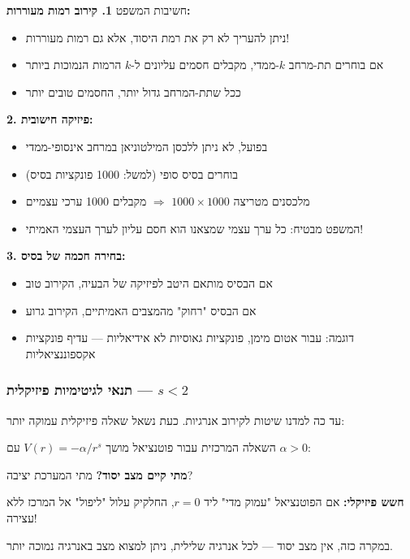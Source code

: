 \begin{importantbox}{חשיבות המשפט}
\textbf{1. קירוב רמות מעוררות:}
\begin{itemize}
    \item ניתן להעריך לא רק את רמת היסוד, אלא גם רמות מעוררות!
    \item אם בוחרים תת-מרחב $k$-ממדי, מקבלים חסמים עליונים ל-$k$ הרמות הנמוכות ביותר
    \item ככל שתת-המרחב גדול יותר, החסמים טובים יותר
\end{itemize}

\textbf{2. פיזיקה חישובית:}
\begin{itemize}
    \item בפועל, לא ניתן ללכסן המילטוניאן במרחב אינסופי-ממדי
    \item בוחרים בסיס סופי (למשל: 1000 פונקציות בסיס)
    \item מלכסנים מטריצה $1000 \times 1000$ $\Rightarrow$ מקבלים 1000 ערכי עצמיים
    \item המשפט מבטיח: כל ערך עצמי שמצאנו הוא חסם עליון לערך העצמי האמיתי!
\end{itemize}

\textbf{3. בחירה חכמה של בסיס:}
\begin{itemize}
    \item אם הבסיס מותאם היטב לפיזיקה של הבעיה, הקירוב טוב
    \item אם הבסיס "רחוק" מהמצבים האמיתיים, הקירוב גרוע
    \item דוגמה: עבור אטום מימן, פונקציות גאוסיות לא אידיאליות — עדיף פונקציות אקספוננציאליות
\end{itemize}
\end{importantbox}

\subsubsection*{תנאי לגיטימיות פיזיקלית — $s < 2$}

עד כה למדנו שיטות לקירוב אנרגיות. כעת נשאל שאלה פיזיקלית עמוקה יותר:

\begin{importantbox}{השאלה המרכזית}
עבור פוטנציאל מושך $V(r) = -\alpha/r^s$ עם $\alpha > 0$:

\textbf{מתי קיים מצב יסוד?} מתי המערכת יציבה?
\end{importantbox}

\textbf{חשש פיזיקלי:} אם הפוטנציאל "עמוק מדי" ליד $r = 0$, החלקיק עלול "ליפול" אל המרכז ללא עצירה!

במקרה כזה, אין מצב יסוד — לכל אנרגיה שלילית, ניתן למצוא מצב באנרגיה נמוכה יותר.

